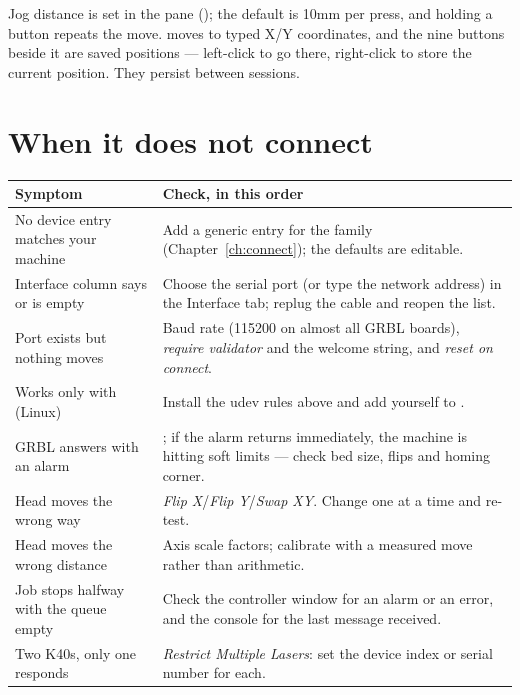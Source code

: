 \noindent Jog distance is set in the  pane
(); the default is 10\unit{mm} per press, and holding a
button repeats the move.  moves to typed X/Y coordinates, and
the nine buttons beside it are saved positions --- left-click to go there,
right-click to store the current position. They persist between sessions.

\section{When it does not connect}

\begin{center}\small
\begin{tabular}{@{}L{6.1cm}L{8.2cm}@{}}
\toprule
\textbf{Symptom} & \textbf{Check, in this order} \\
\midrule
No device entry matches your machine & Add a generic entry for the family
(Chapter~\ref{ch:connect}); the defaults are editable. \\
Interface column says  or is empty & Choose the serial port (or
type the network address) in the Interface tab; replug the cable and reopen the
list. \\
Port exists but nothing moves & Baud rate (115200 on almost all GRBL boards),
\emph{require validator} and the welcome string, and \emph{reset on connect}. \\
Works only with  (Linux) & Install the udev rules above and add yourself
to . \\
GRBL answers with an alarm & ; if the alarm returns
immediately, the machine is hitting soft limits --- check bed size, flips and
homing corner. \\
Head moves the wrong way & \emph{Flip X}/\emph{Flip Y}/\emph{Swap XY}. Change one
at a time and re-test. \\
Head moves the wrong distance & Axis scale factors; calibrate with a measured
move rather than arithmetic. \\
Job stops halfway with the queue empty & Check the controller window for an alarm
or an error, and the console for the last message received. \\
Two K40s, only one responds & \emph{Restrict Multiple Lasers}: set the device
index or serial number for each. \\
\bottomrule
\end{tabular}
\end{center}

